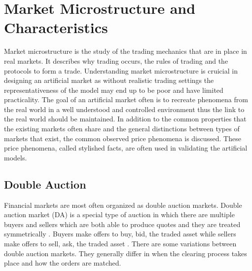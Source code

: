 \section{Market Microstructure and Characteristics}

Market microstructure is the study of the trading mechanics that are in place 
in real markets. It describes why trading occurs, the rules of trading 
and the protocols to form a trade. \citep[p. 3-4]{Has07}
Understanding market microstructure is cruicial in designing an artificial market
as without realistic trading settings the representativeness of the model may end
up to be poor and have limited practicality. The goal of an artificial market often
is to recreate phenomena from the real world in a well understood and controlled 
environment thus the link to the real world should be maintained. In addition to the
common properties that the existing markets often share and the general distinctions between
types of markets that exist,
 the common observed price phenomena is discussed. These price phenomena, called
stylished facts, are often used in validating the artificial models.


\subsection{Double Auction}

Financial markets are most often organized as double auction markets.
Double auction market (DA) is a special type of auction in which there
are multiple buyers and sellers which are both able to 
produce quotes and they are treated symmetrically \citep*{Kle99}. Buyers
make offers to buy, bid, the traded asset while sellers make offers
to sell, ask, the traded asset \citep*{Moc15}. There are some variations 
between double auction markets. They generally differ in when the clearing process takes place 
and how the orders are matched. 


